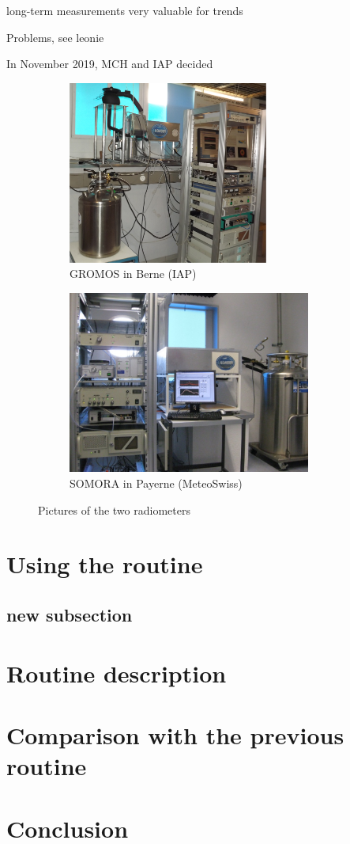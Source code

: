 \documentclass[12pt,a4paper,english,titlepage,twoside]{article}
\begin{document}
long-term measurements very valuable for trends

Problems, see leonie

In November 2019, MCH and IAP decided 


\begin{figure}[h!]
  \centering
  \begin{subfigure}{.5\textwidth}
    \centering
    \includegraphics[height=60mm]{gromos_pics.png}
    \caption{GROMOS in Berne (IAP)}
    \label{fig:sub1}
  \end{subfigure}%
  \begin{subfigure}{.5\textwidth}
    \centering
    \includegraphics[height=60mm]{SOMORA_pic.jpg}
    \caption{SOMORA in Payerne (MeteoSwiss)}
    \label{fig:sub2}
  \end{subfigure}
  \caption{Pictures of the two radiometers}
  \label{fig:GROSOM}
  \end{figure}

\section{Using the routine}

\subsection{new subsection}

\section{Routine description}

\section{Comparison with the previous routine}

\section{Conclusion}
\end{document}
